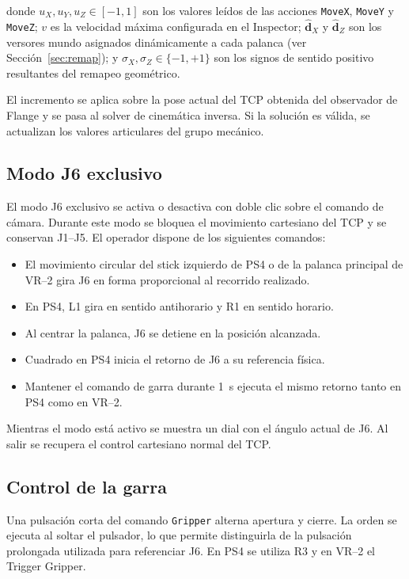 donde $u_X, u_Y, u_Z \in [-1,1]$ son los valores leídos de las acciones
\texttt{MoveX}, \texttt{MoveY} y \texttt{MoveZ}; $v$ es la velocidad máxima
configurada en el Inspector; $\hat{\mathbf{d}}_X$ y $\hat{\mathbf{d}}_Z$ son los
versores mundo asignados dinámicamente a cada palanca (ver
Sección~\ref{sec:remap}); y $\sigma_X, \sigma_Z \in \{-1, +1\}$ son los signos
de sentido positivo resultantes del remapeo geométrico.

El incremento se aplica sobre la pose actual del TCP obtenida del observador de
Flange y se pasa al solver de cinemática inversa. Si la solución es válida, se
actualizan los valores articulares del grupo mecánico.

\subsection{Modo J6 exclusivo}

El modo J6 exclusivo se activa o desactiva con doble clic sobre el comando de
cámara. Durante este modo se bloquea el movimiento cartesiano del TCP y se
conservan J1--J5. El operador dispone de los siguientes comandos:

\begin{itemize}
    \item El movimiento circular del stick izquierdo de PS4 o de la palanca
          principal de VR--2 gira J6 en forma proporcional al recorrido realizado.
    \item En PS4, L1 gira en sentido antihorario y R1 en sentido horario.
    \item Al centrar la palanca, J6 se detiene en la posición alcanzada.
    \item Cuadrado en PS4 inicia el retorno de J6 a su referencia física.
    \item Mantener el comando de garra durante \SI{1}{\second} ejecuta el mismo
          retorno tanto en PS4 como en VR--2.
\end{itemize}

Mientras el modo está activo se muestra un dial con el ángulo actual de J6. Al
salir se recupera el control cartesiano normal del TCP.

\subsection{Control de la garra}

Una pulsación corta del comando \texttt{Gripper} alterna apertura y cierre. La
orden se ejecuta al soltar el pulsador, lo que permite distinguirla de la
pulsación prolongada utilizada para referenciar J6. En PS4 se utiliza R3 y en
VR--2 el Trigger Gripper.

